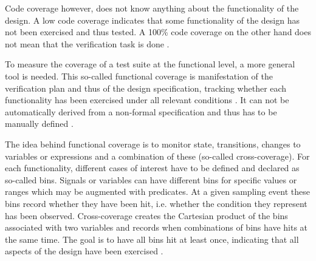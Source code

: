 Code coverage however, does not know anything about the functionality of the design. A low code coverage indicates that
some functionality of the design has not been exercised and thus tested. A 100\% code coverage on the other hand does
not mean that the verification task is done \cite[Ch. 2]{bergeron2012writing}.

To measure the coverage of a test suite at the functional level, a more general tool is needed. This so-called
functional coverage is manifestation of the verification plan and thus of the design specification, tracking whether
each functionality has been exercised under all relevant conditions \cite[Sec. 7.6]{flake2020a}. It can not be
automatically derived from a non-formal specification and thus has to be manually defined \cite[Ch. 15]{mehta2021introduction}.

The idea behind functional coverage is to monitor state, transitions, changes to variables or expressions and a
combination of these (so-called cross-coverage). For each functionality, different cases of interest have to be
defined and declared as so-called bins. Signals or variables can have different bins for specific values or ranges
which may be augmented with predicates. At a given sampling event these bins record whether they have been hit, i.e.
whether the condition they represent has been observed. Cross-coverage creates the Cartesian product of the bins associated with two variables and records when combinations of bins have hits at the same time. The goal is to have all bins hit at least once, indicating
that all aspects of the design have been exercised \cite[Sec. 7.6]{flake2020a}.

